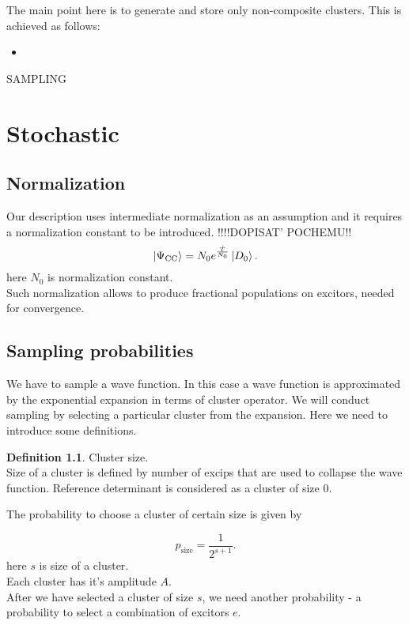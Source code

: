 \documentclass[twoside,english]{uiofysmaster}
\theoremstyle{definition}
\newtheorem{defn}{Definition}
\begin{document}
The main point here is to generate and store only non-composite clusters. This is achieved as follows:
\begin{itemize}
\item 
\end{itemize} 


SAMPLING




















\chapter{Stochastic}
\section{Normalization}
Our description uses intermediate normalization as an assumption and it requires a normalization constant to be introduced. 
!!!!DOPISAT' POCHEMU!!
\begin{equation}
\ket{\Psi_{\text{CC}}}=N_0 e^{\frac{\hat{T}}{N_0}} \ket{D_0}.
\end{equation}
here $N_0$ is normalization constant.\\
Such normalization allows to produce fractional populations on excitors, needed for convergence.
\section{Sampling probabilities}

We have to sample a wave function. In this case a wave function is approximated by the exponential expansion in terms of cluster operator. We will conduct sampling by selecting a particular cluster from the expansion. Here we need to introduce some definitions.\\


\begin{defn}Cluster size.\\
 Size of a cluster is defined by number of excips that are used to collapse the wave function. Reference determinant is considered as a cluster of size $0$.
\end{defn}
The probability to choose a cluster of certain size is given by

\begin{equation}
	p_{\text{size}} = \frac{1}{2^{s+1}}.
\end{equation}
here $s$ is size of a cluster. \\
Each cluster has it's amplitude $A$.\\
After we have selected a cluster of size $s$, we need another probability - a probability to select a combination of excitors $e$.
\end{document}
